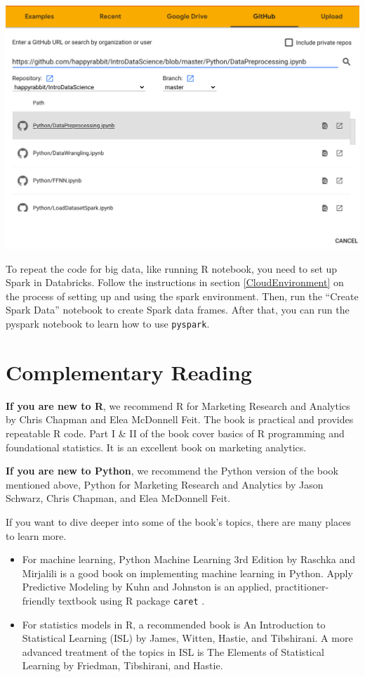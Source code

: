 \documentclass[
  12pt,
]{krantz}
\begin{document}
\begin{center}\includegraphics[width=1\linewidth]{images/loadfromgithub} \end{center}

To repeat the code for big data, like running R notebook, you need to set up Spark in Databricks. Follow the instructions in section \ref{CloudEnvironment} on the process of setting up and using the spark environment. Then, run the ``Create Spark Data'' notebook to create Spark data frames. After that, you can run the pyspark notebook to learn how to use \texttt{pyspark}.

\hypertarget{complementary-reading}{%
\section*{Complementary Reading}\label{complementary-reading}}


\textbf{If you are new to R}, we recommend R for Marketing Research and Analytics by Chris Chapman and Elea McDonnell Feit. The book is practical and provides repeatable R code. Part I \& II of the book cover basics of R programming and foundational statistics. It is an excellent book on marketing analytics.

\textbf{If you are new to Python}, we recommend the Python version of the book mentioned above, Python for Marketing Research and Analytics by Jason Schwarz, Chris Chapman, and Elea McDonnell Feit.

If you want to dive deeper into some of the book's topics, there are many places to learn more.

\begin{itemize}
\item
  For machine learning, Python Machine Learning 3rd Edition by Raschka and Mirjalili is a good book on implementing machine learning in Python. Apply Predictive Modeling by Kuhn and Johnston is an applied, practitioner-friendly textbook using R package \texttt{caret} .
\item
  For statistics models in R, a recommended book is An Introduction to Statistical Learning (ISL) by James, Witten, Hastie, and Tibshirani. A more advanced treatment of the topics in ISL is The Elements of Statistical Learning by Friedman, Tibshirani, and Hastie.
\end{itemize}
\end{document}
